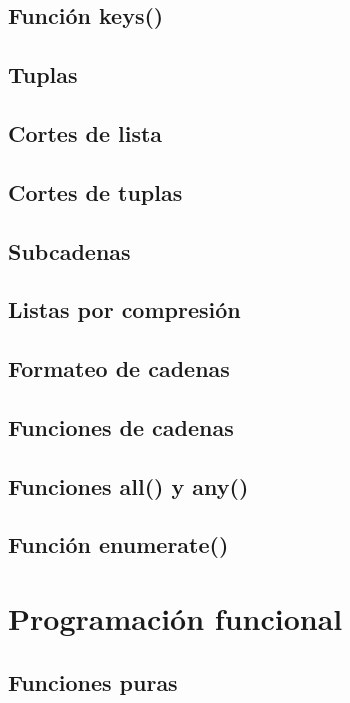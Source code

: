 \documentclass{article}
\begin{document}
\subsection{Función keys()}

\subsection{Tuplas}

\subsection{Cortes de lista}

\subsection{Cortes de tuplas}

\subsection{Subcadenas}

\subsection{Listas por compresión}

\subsection{Formateo de cadenas}

\subsection{Funciones de cadenas}

\subsection{Funciones all() y any()}

\subsection{Función enumerate()}

\newpage\section{Programación funcional}

\subsection{Funciones puras}
\end{document}

